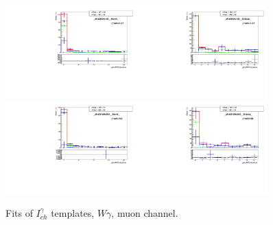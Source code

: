 \begin{figure}[htb]
\begin{center}
   \includegraphics[width=0.45\textwidth]{../figs/figs_v11/MUON_WGamma/TemplateFits/c_TEMPL_CHISO_UNblind__phoEt95to120__Barrel__RooFit.pdf}\includegraphics[width=0.45\textwidth]{../figs/figs_v11/MUON_WGamma/TemplateFits/c_TEMPL_CHISO_UNblind__phoEt95to120__Endcap__RooFit.pdf}\\
   \includegraphics[width=0.45\textwidth]{../figs/figs_v11/MUON_WGamma/TemplateFits/c_TEMPL_CHISO_UNblind__phoEt120to500__Barrel__RooFit.pdf}\includegraphics[width=0.45\textwidth]{../figs/figs_v11/MUON_WGamma/TemplateFits/c_TEMPL_CHISO_UNblind__phoEt120to500__Endcap__RooFit.pdf}\\
  \label{fig:templateFits_CHISO_MUON_3}
  \caption{Fits of $I_{ch}^{\gamma}$ templates, $W\gamma$, muon channel.}
  \end{center}
\end{figure}

